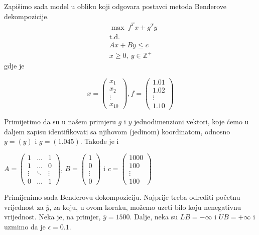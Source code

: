 \documentclass[b5paper, utf8, 11pt, colorlinks]{book}
\theoremstyle{definition}
\begin{document}
Zapišimo sada model u obliku koji odgovara postavci metoda Benderove dekompozicije.
 \begin{equation}\label{primer:formulacija2}
	\begin{aligned}
		&\max\  f^Tx+g^Ty\\
			&\mbox{t.d.}\\ 
		  &Ax+By\leqslant c\\
		&x\geqslant 0,\ y \in \mathbb{Z}^+
	\end{aligned}
\end{equation}
gdje je


$$x=\left(\begin{array}{c}
	x_1 \\
	x_2 \\
	\vdots \\
	x_{10}
\end{array}\right) ,  
 f = \left(\begin{array}{c}
	1.01 \\
	1.02 \\
	\vdots \\
	1.10
\end{array}\right)$$

Primijetimo da su u našem primjeru $g$ i $y$ jednodimenzioni vektori, koje ćemo u daljem zapisu identifikovati sa njihovom (jedinom) koordinatom, odnosno
$y=(y)$ i $g=(1.045)$. Takođe je i 

$A=\left(
\begin{array}{ccc}
	1 & \ldots & 1 \\
	1 & \ldots & 0 \\
	\vdots & \ddots & \vdots \\
	0 & \ldots & 1
\end{array}\right)$, \quad
$B=\left(\begin{array}{c}
	1 \\
	0 \\
	\vdots \\
	0
\end{array}\right)$ i \quad 
$c=\left(\begin{array}{c}
	1000 \\
	100 \\
	\vdots \\
	100
\end{array}\right)$ 


Primijenimo sada Benderovu dokompoziciju. Najprije treba odrediti početnu vrijednost za $\overline{y}$, za koju, u ovom koraku, možemo uzeti bilo koju nenegativnu vrijednost. Neka je, na primjer, $\overline{y}=1500$. Dalje, neka su $LB=-\infty$ i $UB=+\infty$ i uzmimo da je $\epsilon = 0.1$.
\end{document}

